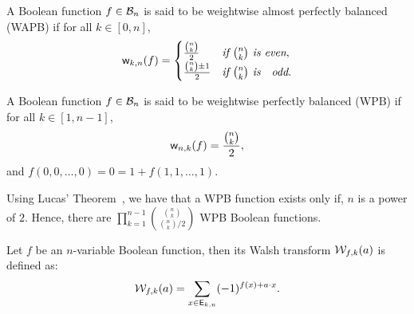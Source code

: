 \documentclass{llncs}
\begin{document}
\begin{definition}\label{def:WAPB}
A Boolean function $f \in \mathcal{B}_n$ is said to be weightwise almost perfectly balanced (WAPB) if for all $k \in [0,n]$, \[\mathsf{w}_{k,n}(f)=
\begin{cases}
\frac{{n\choose k}}{2} & \textit{if } {n \choose k} \textit{ is even},\\
\frac{{n \choose k}\pm 1}{2} & \textit{if } {n \choose k} \textit{ is \; odd}.
\end{cases} \]
\end{definition}

\begin{definition}\label{def:WPB}
A Boolean function $f \in \mathcal{B}_n$ is said to be weightwise perfectly balanced (WPB) if for all $k \in [1,n-1]$, 
\[\mathsf{w}_{n,k}(f) = \frac{{n \choose k}}{2},\]
and $f(0,0,\ldots,0)=0=1+f(1,1,\ldots,1)$.
\end{definition}


Using Lucas' Theorem~\cite{LucasTh}, we have that a WPB function exists only if, $n$ is a power of $2$. Hence, there are $\displaystyle {\prod_{k = 1}^{n-1} {{{n \choose k}} \choose {{n \choose k}/2}}}$ WPB Boolean functions.


\begin{definition}\label{def:restWalsh}
Let $f$ be an $n$-variable Boolean function, then its Walsh transform $\mathcal{W}_{f,k}(a)$ is defined as:
\[\mathcal{W}_{f,k}(a) = \sum_{x \in \mathsf{E}_{k,n}} (-1)^{f(x)+ a \cdot x}.\]
\end{definition}
\end{document}
